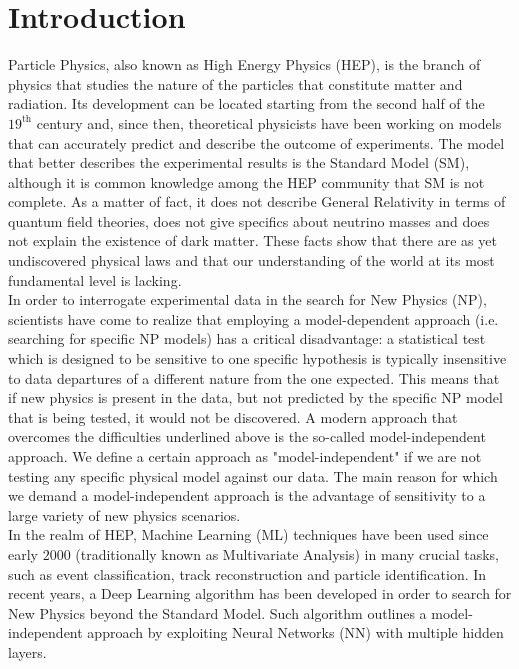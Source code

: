 \chapter{Introduction}
\label{chap:Introduction}


Particle Physics, also known as High Energy Physics (HEP), is the branch of physics that studies the nature of the
particles that constitute matter and radiation. Its development can be located starting from the second half of the
$19^{\text{th}}$ century and, since then, theoretical physicists have been working on models that can accurately predict
and describe the outcome of experiments. The model that better describes the experimental results is the Standard Model
(SM), although it is common knowledge among the HEP community that SM is not complete. As a matter of fact, it does not
describe General Relativity in terms of quantum field theories, does not give specifics about neutrino masses and does
not explain the existence of dark matter. These facts show that there are as yet undiscovered physical laws and that our
understanding of the world at its most fundamental level is lacking.\\

In order to interrogate experimental data in the search for New Physics (NP), scientists have come to realize that
employing a model-dependent approach (i.e. searching for specific NP models) has a critical disadvantage: a statistical
test which is designed to be sensitive to one specific hypothesis is typically insensitive to data departures of a
different nature from the one expected. This means that if new physics is present in the data, but not predicted by the
specific NP model that is being tested, it would not be discovered. A modern approach that overcomes the difficulties
underlined above is the so-called model-independent approach. We define a certain approach as "model-independent" if we
are not testing any specific physical model against our data. The main reason for which we demand a model-independent
approach is the advantage of sensitivity to a large variety of new physics scenarios.\\

In the realm of HEP, Machine Learning (ML) techniques have been used since early $2000$ (traditionally known as
Multivariate Analysis) in many crucial tasks, such as event classification, track reconstruction and particle
identification. In recent years, a Deep Learning algorithm has been developed in order to search for New Physics beyond
the Standard Model. Such algorithm outlines a model-independent approach by exploiting Neural Networks (NN) with
multiple hidden layers.\\

